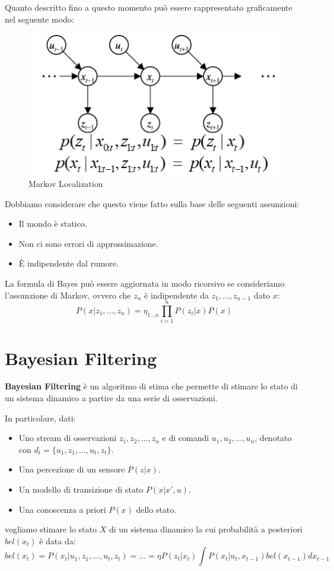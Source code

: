 Quanto descritto fino a questo momento può essere rappresentato graficamente nel
seguente modo:
\begin{figure}[!ht]
    \centering
    \includegraphics[scale=0.5]{./img/ActiveVision/markov_localization.png}
    \caption{Markov Localization}
    \label{fig:markov_localization}
\end{figure}
Dobbiamo considerare che questo viene fatto sulla base delle seguenti assunzioni:
\begin{itemize}
    \item Il mondo è statico.
    \item Non ci sono errori di approssimazione.
    \item È indipendente dal rumore.
\end{itemize}
La formula di Bayes può essere aggiornata in modo ricorsivo se consideriamo l'assunzione
di Markov, ovvero che $z_n$ è indipendente da $z_1, \dots, z_{n-1}$ dato $x$:
\begin{equation}
    P(x | z_1, \dots, z_n) = \eta_{1 \dots n} \prod_{i=1}^{n} P(z_i | x) P(x)
\end{equation}
\section{Bayesian Filtering}
\textbf{Bayesian Filtering} è un algoritmo di stima che permette di stimare lo stato
di un sistema dinamico a partire da una serie di osservazioni.

In particolare, dati:
\begin{itemize}
    \item Uno stream di osservazioni $z_1, z_2, \dots, z_n$ e di comandi $u_1,
              u_2, \dots, u_n$, denotato con $d_t = \{u_1, z_1, \dots, u_t, z_t\}$.
    \item Una percezione di un sensore $P(z|x)$.
    \item Un modello di transizione di stato $P(x|x',u)$.
    \item Una conoscenza a priori $P(x)$ dello stato.
\end{itemize}
vogliamo stimare lo stato $X$ di un sistema dinamico la cui probabilità a posteriori
$bel(x_t)$ è data da:
\begin{equation}
    bel(x_t) = P(x_t | u_1, z_1, \dots, u_t, z_t) = \dots = 
    \eta P(z_t|x_t) \int P(x_t|u_t, x_{t - 1})bel(x_{t - 1})dx_{t - 1}
\end{equation} 
